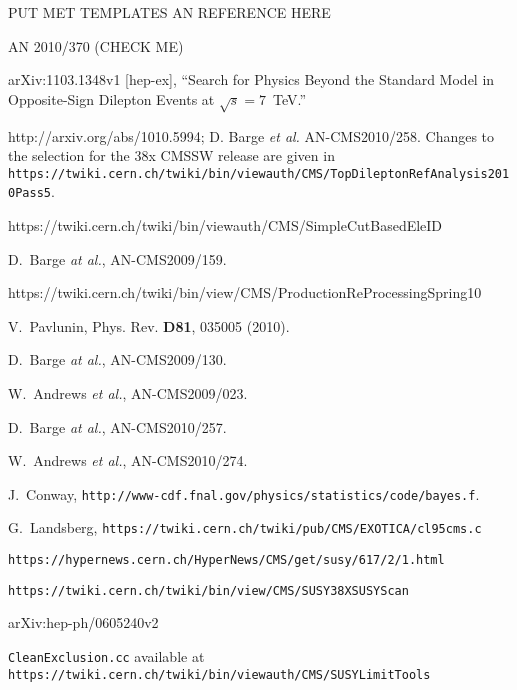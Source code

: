 \begin{thebibliography}{10}

 PUT MET TEMPLATES AN REFERENCE HERE

 AN 2010/370 (CHECK ME)

 arXiv:1103.1348v1 [hep-ex], ``Search for Physics Beyond the Standard Model in Opposite-Sign Dilepton Events at $\sqrt{s} = 7$~TeV.''

 http://arxiv.org/abs/1010.5994; 
D. Barge {\em et al.}  AN-CMS2010/258.  Changes to the selection for the 38x
CMSSW release are given in \\
{\tt https://twiki.cern.ch/twiki/bin/viewauth/CMS/TopDileptonRefAnalysis2010Pass5}.

 https://twiki.cern.ch/twiki/bin/viewauth/CMS/SimpleCutBasedEleID

 D.~Barge {\em at al.}, AN-CMS2009/159.

 https://twiki.cern.ch/twiki/bin/view/CMS/ProductionReProcessingSpring10 


V.~Pavlunin, Phys. Rev. {\bf D81}, 035005 (2010).

  D.~Barge {\em at al.}, AN-CMS2009/130.

 W.~Andrews {\em et al.}, AN-CMS2009/023.

 D.~Barge {\em at al.}, AN-CMS2010/257.

W.~Andrews {\em et al.}, AN-CMS2010/274.

 J.~Conway, {\tt http://www-cdf.fnal.gov/physics/statistics/code/bayes.f}.

 G.~Landsberg, {\tt https://twiki.cern.ch/twiki/pub/CMS/EXOTICA/cl95cms.c}

 {\tt https://hypernews.cern.ch/HyperNews/CMS/get/susy/617/2/1.html}

 {\tt https://twiki.cern.ch/twiki/bin/view/CMS/SUSY38XSUSYScan}

 arXiv:hep-ph/0605240v2

 {\tt CleanExclusion.cc} available at
{\tt https://twiki.cern.ch/twiki/bin/viewauth/CMS/SUSYLimitTools}


\end{thebibliography}
